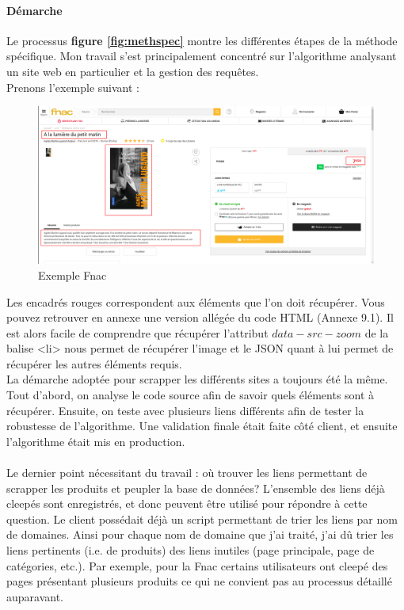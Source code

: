 \documentclass{article} %
\begin{document}
\paragraph{Démarche\\}
Le processus \textbf{figure \ref{fig:methspec}} montre les différentes étapes de la méthode spécifique. Mon travail s'est principalement concentré sur l'algorithme analysant un site web en particulier et la gestion des requêtes.\\
Prenons l'exemple suivant \cite{fnac} :
\begin{figure}[!h]
 \centering
 \includegraphics[keepaspectratio = true,scale=0.25]{fnac.png}
 \caption{Exemple Fnac}
\end{figure}
Les encadrés rouges correspondent aux éléments que l'on doit récupérer. Vous pouvez retrouver en annexe une version allégée du code HTML (Annexe 9.1). Il est alors facile de comprendre que récupérer l'attribut $data-src-zoom$ de la balise <li> nous permet de récupérer l'image et le JSON quant à lui permet de récupérer les autres éléments requis.\\
La démarche adoptée pour scrapper les différents sites a toujours été la même. Tout d'abord, on analyse le code source afin de savoir quels éléments sont à récupérer. Ensuite, on teste avec plusieurs liens différents afin de tester la robustesse de l'algorithme. Une validation finale était faite côté client, et ensuite l'algorithme était mis en production.\\ \\
Le dernier point nécessitant du travail : où trouver les liens permettant de scrapper les produits et peupler la base de données? L'ensemble des liens déjà cleepés sont enregistrés, et donc peuvent être utilisé pour répondre à cette question. Le client possédait déjà un script permettant de trier les liens par nom de domaines. Ainsi pour chaque nom de domaine que j'ai traité, j'ai dû trier les liens pertinents (i.e. de produits) des liens inutiles (page principale, page de catégories, etc.). Par exemple, pour la Fnac certains utilisateurs ont cleepé des pages présentant plusieurs produits \cite{mve} ce qui ne convient pas au processus détaillé auparavant.
\end{document}
